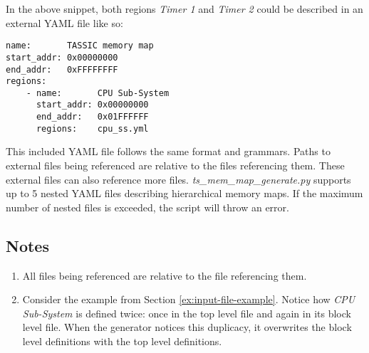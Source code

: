 \documentclass{tropic_design_spec}
\begin{document}
In the above snippet, both regions \textit{Timer 1} and \textit{Timer 2} could be described
in an external YAML file like so:

\begin{lstlisting}
name:       TASSIC memory map
start_addr: 0x00000000
end_addr:   0xFFFFFFFF
regions:
    - name:       CPU Sub-System
      start_addr: 0x00000000
      end_addr:   0x01FFFFFF
      regions:    cpu_ss.yml
\end{lstlisting}

This included YAML file follows the same format and grammars. Paths to external files being
referenced are relative to the files referencing them. These external files can also reference
more files. \textit{ts_mem_map_generate.py} supports up to 5 nested YAML files describing
hierarchical memory maps. If the maximum number of nested files is exceeded, the script
will throw an error.

\pagebreak
\subsection{Notes}

\begin{enumerate}
    
    \item{All files being referenced are relative to the file referencing them.}

    \item{Consider the example from Section \ref{ex:input-file-example}. Notice how 
    \textit{CPU Sub-System} is defined twice: once in the top level file and again in
    its block level file. When the generator notices this duplicacy, it overwrites the 
    block level definitions with the top level definitions. }

\end{enumerate}
\end{document}
